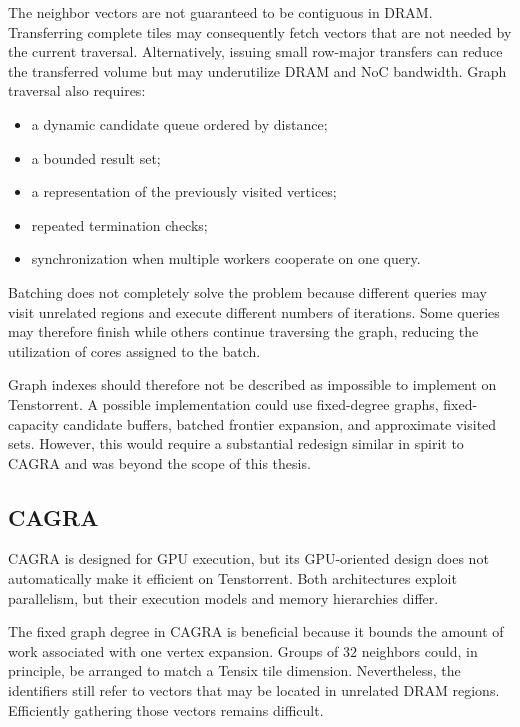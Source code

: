 The neighbor vectors are not guaranteed to be contiguous in DRAM. Transferring complete tiles may consequently fetch vectors that are not needed by the current traversal. Alternatively, issuing small row-major transfers can reduce the transferred volume but may underutilize DRAM and NoC bandwidth.
\newline
Graph traversal also requires:
\begin{itemize}
\item a dynamic candidate queue ordered by distance;
\item a bounded result set;
\item a representation of the previously visited vertices;
\item repeated termination checks;
\item synchronization when multiple workers cooperate on one query.
\end{itemize}

Batching does not completely solve the problem because different queries may visit unrelated regions and execute different numbers of iterations. Some queries may therefore finish while others continue traversing the graph, reducing the utilization of cores assigned to the batch.

Graph indexes should therefore not be described as impossible to implement on Tenstorrent. A possible implementation could use fixed-degree graphs, fixed-capacity candidate buffers, batched frontier expansion, and approximate visited sets. However, this would require a substantial redesign similar in spirit to CAGRA and was beyond the scope of this thesis.

\subsection{CAGRA}
\label{subsec:cagra-tt-fit}

CAGRA is designed for GPU execution, but its GPU-oriented design does not automatically make it efficient on Tenstorrent. Both architectures exploit parallelism, but their execution models and memory hierarchies differ.

The fixed graph degree in CAGRA is beneficial because it bounds the amount of work associated with one vertex expansion. Groups of \(32\) neighbors could, in principle, be arranged to match a Tensix tile dimension. Nevertheless, the identifiers still refer to vectors that may be located in unrelated DRAM regions. Efficiently gathering those vectors remains difficult.

